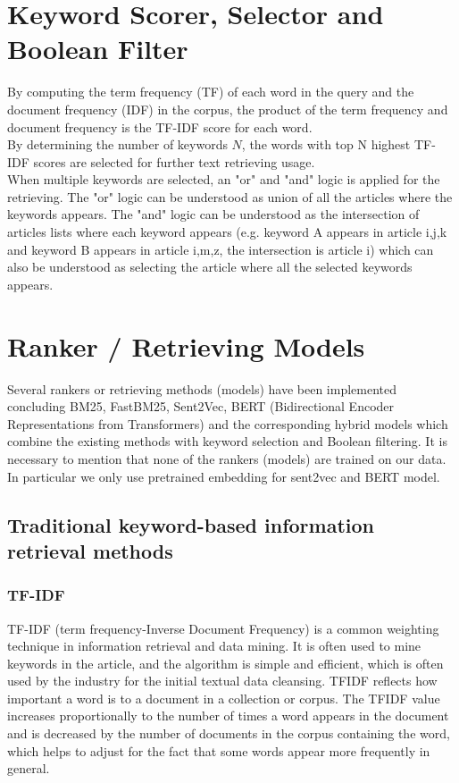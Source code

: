 \section{Keyword Scorer, Selector and Boolean Filter}
By computing the term frequency (TF) of each word in the query and the document frequency (IDF) in the corpus, the product of the term frequency and document frequency is the TF-IDF score for each word. \\

By determining the number of keywords $N$, the words with top N highest TF-IDF scores are selected for further text retrieving usage.\\

When multiple keywords are selected, an "or" and "and" logic is applied for the retrieving. 
The "or" logic can be understood as union of all the articles where the keywords appears.
The "and" logic can be understood as the intersection of articles lists where each keyword appears (e.g. keyword A appears in article i,j,k and keyword B appears in article i,m,z, the intersection is article i) which can also be understood as selecting the article where all the selected keywords appears.

\section{Ranker / Retrieving Models}
Several rankers or retrieving methods (models) have been implemented concluding BM25, FastBM25, Sent2Vec, BERT (Bidirectional Encoder Representations from Transformers) and the corresponding hybrid models which combine the existing methods with keyword selection and Boolean filtering.	
It is necessary to mention that none of the rankers (models) are trained on our data. In particular we only use pretrained embedding for sent2vec and BERT model.

\subsection{Traditional keyword-based information retrieval methods}		
\subsubsection{TF-IDF}		

TF-IDF \cite{wikipedia_TFIDF} (term frequency-Inverse Document Frequency) is a common weighting technique in information retrieval and data mining. It is often used to mine keywords in the article, and the algorithm is simple and efficient, which is often used by the industry for the initial textual data cleansing. TFIDF reflects how important a word is to a document in a collection or corpus. The TFIDF value increases proportionally to the number of times a word appears in the document and is decreased by the number of documents in the corpus containing the word, which helps to adjust for the fact that some words appear more frequently in general.\\

